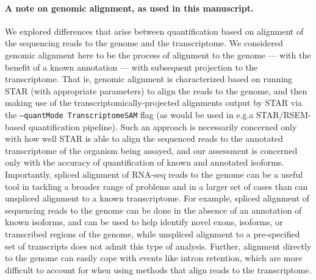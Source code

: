 \paragraph{A note on genomic alignment, as used in this manuscript.}
We explored differences that arise between quantification
based on alignment of the sequencing reads to the genome and the transcriptome. 
We considered genomic alignment here to be the process of
alignment to the genome --- with the benefit of a known annotation ---
with subsequent projection to the transcriptome. That is, genomic
alignment is characterized based on running STAR (with appropriate parameters)
to align the reads to the genome, and then making use of the
transcriptomically-projected alignments output by STAR via the
\texttt{--quantMode TranscriptomeSAM} flag (as would be used in e.g.\@ a
STAR\citep{star}/RSEM\citep{rsem}-based quantification pipeline). Such an
approach is necessarily concerned only with how well STAR is able to align the
sequenced reads to the annotated transcriptome of the organism being
assayed, and our assessment is concerned only with the accuracy of
quantification of known and annotated isoforms. Importantly, spliced alignment of
RNA-seq reads to the genome can be a useful tool in tackling a broader range of
problems and in a larger set of cases than can unspliced alignment to a known
transcriptome. For example, spliced alignment of sequencing reads to the genome
can be done in the absence of an annotation of known isoforms, and can be used
to help identify novel exons, isoforms, or transcribed regions of the genome,
while unspliced alignment to a pre-specified set of transcripts does not admit
this type of analysis. Further, alignment directly to the genome can easily cope
with events like intron retention, which are more difficult to account for when
using methods that align reads to the transcriptome.

